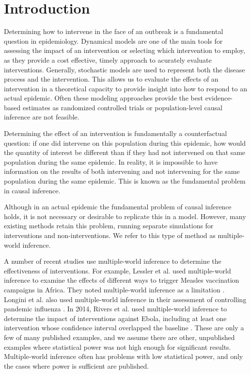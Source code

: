 \documentclass[openacc]{rsproca_new}%
\begin{document}

\maketitle


\section{Introduction}
Determining how to intervene in the face of an outbreak is a fundamental question in epidemiology.
Dynamical models are one of the main tools for assessing the impact of an intervention or selecting which intervention to employ, as they provide a cost effective, timely approach to acurately evaluate interventions.
Generally, stochastic models are used to represent both the disease process and the intervention.
This allows us to evaluate the effects of an intervention in a theoretical capacity to provide insight into how to respond to an actual epidemic.
Often these modeling approaches provide the best evidence-based estimates as randomized controlled trials or population-level causal inference are not feasible.

Determining the effect of an intervention is fundamentally a counterfactual question: if one did intervene on this population during this epidemic, how would the quantity of interest be different than if they had not intervened on that same population during the same epidemic.
In reality, it is impossible to have information on the results of both intervening and not intervening for the same population during the same epidemic.
This is known as the fundamental problem in causal inference.\cite{holland:1986}

Although in an actual epidemic the fundamental problem of causal inference holds, it is not necessary or desirable to replicate this in a model. 
However, many existing methods retain this problem, running separate simulations for interventions and non-interventions.
We refer to this type of method as multiple-world inference.

A number of recent studies use multiple-world inference to determine the effectiveness of interventions.
For example, Lessler et al. used multiple-world inference to examine the effects of different ways to trigger Measles vaccination campaigns in Africa. They noted multiple-world inference as a limitation \cite{lessler-et-al:2016}.
Longini et al. also used multiple-world inference in their assessment of controlling pandemic influenza \cite{longini-et-al:2005}.
In 2014, Rivers et al. used multiple-world inference to determine the impact of interventions against Ebola, including at least one intervention whose confidence interval overlapped the baseline \cite{rivers-et-al:2014}.
These are only a few of many published examples, and we assume there are other, unpublished examples where statistical power was not high enough for significant results.
Multiple-world inference often has problems with low statistical power, and only the cases where power is sufficient are published.
\end{document}
